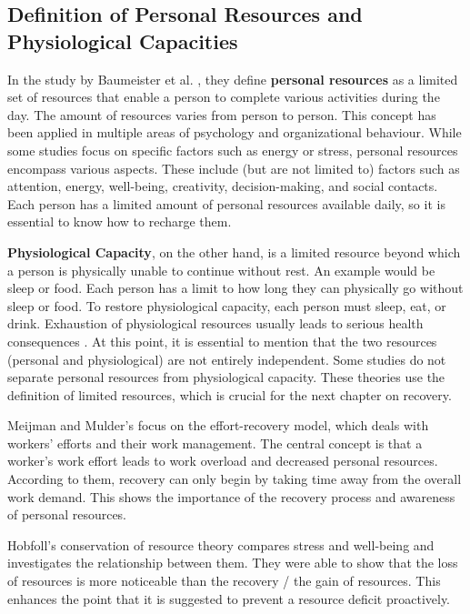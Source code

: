 \documentclass{hasel_thesis}
\begin{document}
\subsection{Definition of Personal Resources and Physiological Capacities}
In the study by Baumeister et al. \cite{BaumeisterR.F.BratslavskyE.MuravenM.&TiceD.M..1998}, they define \textbf{personal resources} as a limited set of resources that enable a person to complete various activities during the day. The amount of resources varies from person to person. This concept has been applied in multiple areas of psychology and organizational behaviour. While some studies focus on specific factors such as energy or stress, personal resources encompass various aspects. These include (but are not limited to) factors such as attention, energy, well-being, creativity, decision-making, and social contacts. Each person has a limited amount of personal resources available daily, so it is essential to know how to recharge them. 

\textbf{Physiological Capacity}, on the other hand, is a limited resource beyond which a person is physically unable to continue without rest. An example would be sleep or food. Each person has a limit to how long they can physically go without sleep or food. To restore physiological capacity, each person must sleep, eat, or drink. Exhaustion of physiological resources usually leads to serious health consequences \cite{Trougakos.2009}. At this point, it is essential to mention that the two resources (personal and physiological) are not entirely independent.
Some studies \cite{Meijman.1998,Hobfoll.1989, Hobfoll.1998} do not separate personal resources from physiological capacity. These theories use the definition of limited resources, which is crucial for the next chapter on recovery.

Meijman and Mulder's \cite{Meijman.1998} focus on the effort-recovery model, which deals with workers' efforts and their work management. The central concept is that a worker's work effort leads to work overload and decreased personal resources. According to them, recovery can only begin by taking time away from the overall work demand. This shows the importance of the recovery process and awareness of personal resources.

Hobfoll's \cite{Hobfoll.1989, Hobfoll.1998} conservation of resource theory compares stress and well-being and investigates the relationship between them. They were able to show that the loss of resources is more noticeable than the recovery / the gain of resources. This enhances the point that it is suggested to prevent a resource deficit proactively.
\end{document}
